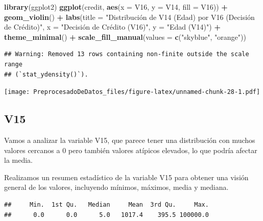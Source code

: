 \documentclass[
]{article}
\newenvironment{Shaded}{\begin{snugshade}}{\end{snugshade}}
\newcommand{\AttributeTok}[1]{\textcolor[rgb]{0.13,0.29,0.53}{#1}}
\newcommand{\FunctionTok}[1]{\textcolor[rgb]{0.13,0.29,0.53}{\textbf{#1}}}
\newcommand{\NormalTok}[1]{#1}
\newcommand{\SpecialCharTok}[1]{\textcolor[rgb]{0.81,0.36,0.00}{\textbf{#1}}}
\newcommand{\StringTok}[1]{\textcolor[rgb]{0.31,0.60,0.02}{#1}}
\begin{document}
\begin{Shaded}
\begin{Highlighting}[]
\FunctionTok{library}\NormalTok{(ggplot2)}
    \FunctionTok{ggplot}\NormalTok{(credit, }\FunctionTok{aes}\NormalTok{(}\AttributeTok{x =}\NormalTok{ V16, }\AttributeTok{y =}\NormalTok{ V14, }\AttributeTok{fill =}\NormalTok{ V16)) }\SpecialCharTok{+} 
        \FunctionTok{geom\_violin}\NormalTok{() }\SpecialCharTok{+}
        \FunctionTok{labs}\NormalTok{(}\AttributeTok{title =} \StringTok{"Distribución de V14 (Edad) por V16 (Decisión de Crédito)"}\NormalTok{,}
            \AttributeTok{x =} \StringTok{"Decisión de Crédito (V16)"}\NormalTok{, }
            \AttributeTok{y =} \StringTok{"Edad (V14)"}\NormalTok{) }\SpecialCharTok{+}
    \FunctionTok{theme\_minimal}\NormalTok{() }\SpecialCharTok{+}
    \FunctionTok{scale\_fill\_manual}\NormalTok{(}\AttributeTok{values =} \FunctionTok{c}\NormalTok{(}\StringTok{"skyblue"}\NormalTok{, }\StringTok{"orange"}\NormalTok{))}
\end{Highlighting}
\end{Shaded}

\begin{verbatim}
## Warning: Removed 13 rows containing non-finite outside the scale range
## (`stat_ydensity()`).
\end{verbatim}

\texttt{[image: PreprocesadoDeDatos\_files/figure-latex/unnamed-chunk-28-1.pdf]}

\hypertarget{v15}{%
\subsection{V15}\label{v15}}

Vamos a analizar la variable V15, que parece tener una distribución con
muchos valores cercanos a 0 pero también valores atípicos elevados, lo
que podría afectar la media.

Realizamos un resumen estadístico de la variable V15 para obtener una
visión general de los valores, incluyendo mínimos, máximos, media y
mediana.

\begin{Shaded}
\end{Shaded}

\begin{verbatim}
##     Min.  1st Qu.   Median     Mean  3rd Qu.     Max. 
##      0.0      0.0      5.0   1017.4    395.5 100000.0
\end{verbatim}
\end{document}
